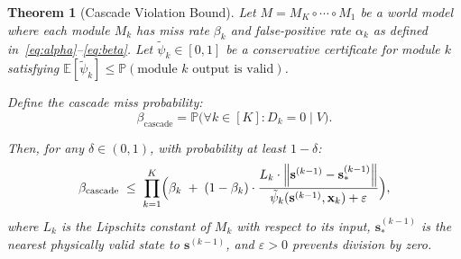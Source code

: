 \documentclass[11pt,twocolumn]{article}
\newtheorem{theorem}{Theorem}[section]
\theoremstyle{definition}
\newcommand{\E}{\mathbb{E}}
\newcommand{\Pbb}{\mathbb{P}}
\newcommand{\norm}[1]{\left\lVert#1\right\rVert}
\begin{document}
\begin{theorem}[Cascade Violation Bound]
\label{thm:cascade}
Let $M = M_K \circ \cdots \circ M_1$ be a world model where each module
$M_k$ has miss rate $\beta_k$ and false-positive rate $\alpha_k$ as defined
in~\eqref{eq:alpha}--\eqref{eq:beta}.  Let $\tilde{\psi}_k \in [0,1]$ be a
conservative certificate for module $k$ satisfying
$\E[\tilde{\psi}_k] \le \Pbb(\text{module }k\text{ output is valid})$.

Define the \emph{cascade miss probability}:
\begin{equation}
  \beta_{\text{cascade}} = \Pbb\bigl(\forall k \in [K]: D_k = 0 \mid V\bigr).
\end{equation}

Then, for any $\delta \in (0,1)$, with probability at least $1-\delta$:
\begin{equation}\label{eq:cascade_bound}
  \beta_{\text{cascade}} \;\le\;
  \prod_{k=1}^{K}
  \Bigl(
    \beta_k \;+\; (1-\beta_k) \cdot
    \frac{L_k \cdot \norm{\mathbf{s}^{(k-1)} - \mathbf{s}^{(k-1)}_*}}
         {\tilde{\psi}_k(\mathbf{s}^{(k-1)}, \mathbf{x}_k) + \varepsilon}
  \Bigr),
\end{equation}
where $L_k$ is the Lipschitz constant of $M_k$ with respect to its input,
$\mathbf{s}^{(k-1)}_*$ is the nearest physically valid state to
$\mathbf{s}^{(k-1)}$, and $\varepsilon > 0$ prevents division by zero.
\end{theorem}
\end{document}
